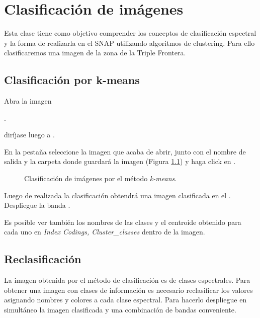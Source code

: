 \chapter{Clasificación de imágenes}

Esta clase tiene como objetivo comprender los conceptos de clasificación espectral y la forma de realizarla en el SNAP utilizando algoritmos de clustering. Para ello clasificaremos una imagen de la zona de la Triple Frontera.

\section{Clasificación por k-means}

Abra la imagen

\begin{center}
.
\end{center}

diríjase luego a .

En la pestaña  seleccione la imagen que acaba de abrir, junto con el nombre de salida y la carpeta donde guardará la imagen (Figura \ref{fig:kmeans}) y haga click en .

\begin{figure}[h!]
    \centering
    \hspace{1cm}
    \caption{Clasificación de imágenes por el método \emph{k-means}.}
    \label{fig:kmeans}
\end{figure}

Luego de realizada la clasificación obtendrá una imagen clasificada en el . Despliegue la banda .

Es posible ver también los nombres de las clases y el centroide obtenido para cada uno en \emph{Index Codings, Cluster\_classes} dentro de la imagen.

\section{Reclasificación}

La imagen obtenida por el método de clasificación es de clases espectrales. Para obtener una imagen con clases de información es necesario reclasificar los valores asignando nombres y colores a cada clase espectral. Para hacerlo despliegue en simultáneo la imagen clasificada y una combinación de bandas conveniente.

